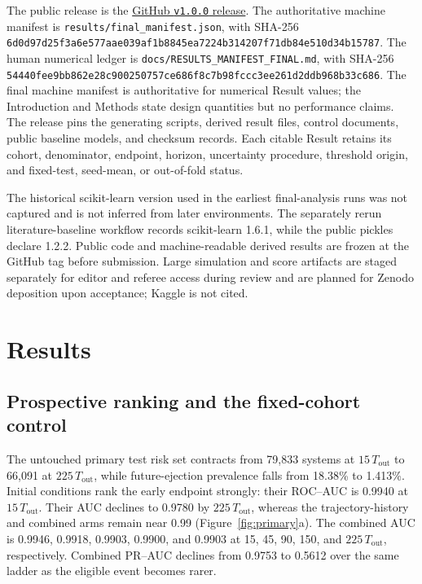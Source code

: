 \documentclass[linenumbers,twocolumn]{aastex702}
\newcommand{\Tout}{T_{\mathrm{out}}}
\begin{document}
The public release is the \href{https://github.com/mklienresearch-research/Hierarchical-triple-ejection-diagnostics/releases/tag/v1.0.0}{GitHub \texttt{v1.0.0} release}. The authoritative machine manifest is \texttt{results/final\_manifest.json}, with SHA-256 \texttt{6d0d97d25f3a6e57\allowbreak 7aae039af1b8845e\allowbreak a7224b314207f71d\allowbreak b84e510d34b15787}. The human numerical ledger is \texttt{docs/RESULTS\_MANIFEST\_FINAL.md}, with SHA-256 \texttt{54440fee9bb862e2\allowbreak 8c900250757ce686\allowbreak f8c7b98fccc3ee26\allowbreak 1d2ddb968b33c686}.
The final machine manifest is authoritative for numerical Result values; the Introduction and Methods state design quantities but no performance claims. The release pins the generating scripts, derived result files, control documents, public baseline models, and checksum records. Each citable Result retains its cohort, denominator, endpoint, horizon, uncertainty procedure, threshold origin, and fixed-test, seed-mean, or out-of-fold status.

The historical scikit-learn version used in the earliest final-analysis runs was not captured and is not inferred from later environments. The separately rerun literature-baseline workflow records scikit-learn 1.6.1, while the public pickles declare 1.2.2. Public code and machine-readable derived results are frozen at the GitHub tag before submission. Large simulation and score artifacts are staged separately for editor and referee access during review and are planned for Zenodo deposition upon acceptance; Kaggle is not cited.


\section{Results}\label{sec:results}

\subsection{Prospective ranking and the fixed-cohort control}\label{sec:ranking}

The untouched primary test risk set contracts from 79,833 systems at $15\,\Tout$ to 66,091 at $225\,\Tout$, while future-ejection prevalence falls from 18.38\% to 1.413\%. Initial conditions rank the early endpoint strongly: their ROC--AUC is 0.9940 at $15\,\Tout$. Their AUC declines to 0.9780 by $225\,\Tout$, whereas the trajectory-history and combined arms remain near 0.99 (Figure~\ref{fig:primary}a). The combined AUC is 0.9946, 0.9918, 0.9903, 0.9900, and 0.9903 at 15, 45, 90, 150, and $225\,\Tout$, respectively. Combined PR--AUC declines from 0.9753 to 0.5612 over the same ladder as the eligible event becomes rarer.
\end{document}
